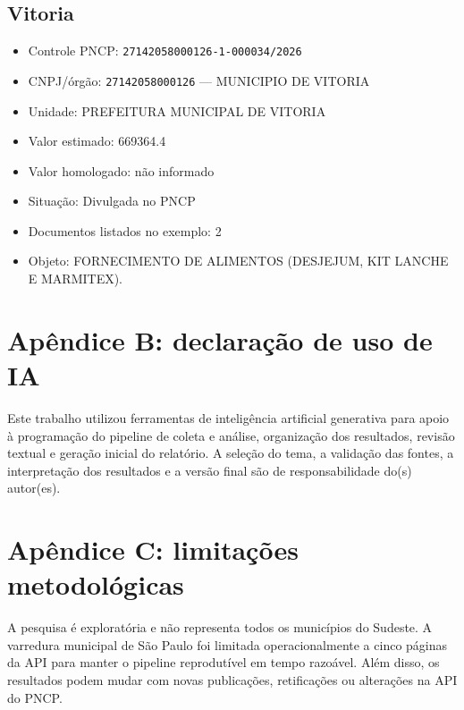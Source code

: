 \documentclass[12pt]{article}
\providecommand{\tightlist}{%
  \setlength{\itemsep}{0pt}\setlength{\parskip}{0pt}}
\begin{document}
\subsection{Vitoria}\label{vitoria}

\begin{itemize}
\tightlist
\item
  Controle PNCP: \texttt{27142058000126-1-000034/2026}
\item
  CNPJ/órgão: \texttt{27142058000126} --- MUNICIPIO DE VITORIA
\item
  Unidade: PREFEITURA MUNICIPAL DE VITORIA
\item
  Valor estimado: 669364.4
\item
  Valor homologado: não informado
\item
  Situação: Divulgada no PNCP
\item
  Documentos listados no exemplo: 2
\item
  Objeto: FORNECIMENTO DE ALIMENTOS (DESJEJUM, KIT LANCHE E MARMITEX).
\end{itemize}

\section{Apêndice B: declaração de uso de
IA}\label{apuxeandice-b-declarauxe7uxe3o-de-uso-de-ia}

Este trabalho utilizou ferramentas de inteligência artificial generativa
para apoio à programação do pipeline de coleta e análise, organização
dos resultados, revisão textual e geração inicial do relatório. A
seleção do tema, a validação das fontes, a interpretação dos resultados
e a versão final são de responsabilidade do(s) autor(es).

\section{Apêndice C: limitações
metodológicas}\label{apuxeandice-c-limitauxe7uxf5es-metodoluxf3gicas}

A pesquisa é exploratória e não representa todos os municípios do
Sudeste. A varredura municipal de São Paulo foi limitada
operacionalmente a cinco páginas da API para manter o pipeline
reprodutível em tempo razoável. Além disso, os resultados podem mudar
com novas publicações, retificações ou alterações na API do PNCP.
\end{document}
